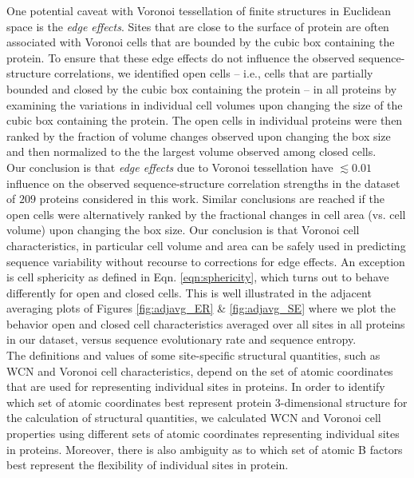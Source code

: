 \documentclass[11pt]{article}
\begin{document}
        One potential caveat with Voronoi tessellation of finite structures in Euclidean space is the {\it edge effects}. Sites that are close to the surface of protein are often associated with Voronoi cells that are bounded by the cubic box containing the protein. To ensure that these edge effects do not influence the observed sequence-structure correlations, we identified open cells -- i.e., cells that are partially bounded and closed by the cubic box containing the protein -- in all proteins by examining the variations in individual cell volumes upon changing the size of the cubic box containing the protein. The open cells in individual proteins were then ranked by the fraction of volume changes observed upon changing the box size and then normalized to the the largest volume observed among closed cells. \\

        Our conclusion is that {\it edge effects} due to Voronoi tessellation have $\lesssim0.01$ influence on the observed sequence-structure correlation strengths in the dataset of $209$ proteins considered in this work. Similar conclusions are reached if the open cells were alternatively ranked by the fractional changes in cell area (vs. cell volume) upon changing the box size. Our conclusion is that Voronoi cell characteristics, in particular cell volume and area can be safely used in predicting sequence variability without recourse to corrections for edge effects. An exception is cell sphericity as defined in Eqn. \ref{eqn:sphericity}, which turns out to behave differently for open and closed cells. This is well illustrated in the adjacent averaging plots of Figures \ref{fig:adjavg_ER} \& \ref{fig:adjavg_SE} where we plot the behavior open and closed cell characteristics averaged over all sites in all proteins in our dataset, versus sequence evolutionary rate and sequence entropy. \\
		
        The definitions and values of some site-specific structural quantities, such as WCN and Voronoi cell characteristics, depend on the set of atomic coordinates that are used for representing individual sites in proteins. In order to identify which set of atomic coordinates best represent protein 3-dimensional structure for the calculation of structural quantities, we calculated WCN and Voronoi cell properties using different sets of atomic coordinates representing individual sites in proteins. Moreover, there is also ambiguity as to which set of atomic B factors best represent the flexibility of individual sites in protein. \\
        
\end{document}
